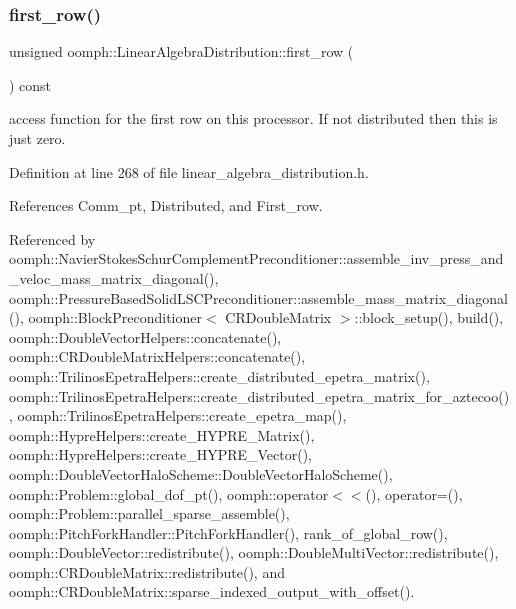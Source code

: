 \subsubsection{\texorpdfstring{first\+\_\+row()}{first\_row()}\hspace{0.1cm}{\footnotesize\ttfamily [1/2]}}
{\footnotesize\ttfamily unsigned oomph\+::\+Linear\+Algebra\+Distribution\+::first\+\_\+row (\begin{DoxyParamCaption}{ }\end{DoxyParamCaption}) const\hspace{0.3cm}{\ttfamily [inline]}}



access function for the first row on this processor. If not distributed then this is just zero. 



Definition at line 268 of file linear\+\_\+algebra\+\_\+distribution.\+h.



References Comm\+\_\+pt, Distributed, and First\+\_\+row.



Referenced by oomph\+::\+Navier\+Stokes\+Schur\+Complement\+Preconditioner\+::assemble\+\_\+inv\+\_\+press\+\_\+and\+\_\+veloc\+\_\+mass\+\_\+matrix\+\_\+diagonal(), oomph\+::\+Pressure\+Based\+Solid\+L\+S\+C\+Preconditioner\+::assemble\+\_\+mass\+\_\+matrix\+\_\+diagonal(), oomph\+::\+Block\+Preconditioner$<$ C\+R\+Double\+Matrix $>$\+::block\+\_\+setup(), build(), oomph\+::\+Double\+Vector\+Helpers\+::concatenate(), oomph\+::\+C\+R\+Double\+Matrix\+Helpers\+::concatenate(), oomph\+::\+Trilinos\+Epetra\+Helpers\+::create\+\_\+distributed\+\_\+epetra\+\_\+matrix(), oomph\+::\+Trilinos\+Epetra\+Helpers\+::create\+\_\+distributed\+\_\+epetra\+\_\+matrix\+\_\+for\+\_\+aztecoo(), oomph\+::\+Trilinos\+Epetra\+Helpers\+::create\+\_\+epetra\+\_\+map(), oomph\+::\+Hypre\+Helpers\+::create\+\_\+\+H\+Y\+P\+R\+E\+\_\+\+Matrix(), oomph\+::\+Hypre\+Helpers\+::create\+\_\+\+H\+Y\+P\+R\+E\+\_\+\+Vector(), oomph\+::\+Double\+Vector\+Halo\+Scheme\+::\+Double\+Vector\+Halo\+Scheme(), oomph\+::\+Problem\+::global\+\_\+dof\+\_\+pt(), oomph\+::operator$<$$<$(), operator=(), oomph\+::\+Problem\+::parallel\+\_\+sparse\+\_\+assemble(), oomph\+::\+Pitch\+Fork\+Handler\+::\+Pitch\+Fork\+Handler(), rank\+\_\+of\+\_\+global\+\_\+row(), oomph\+::\+Double\+Vector\+::redistribute(), oomph\+::\+Double\+Multi\+Vector\+::redistribute(), oomph\+::\+C\+R\+Double\+Matrix\+::redistribute(), and oomph\+::\+C\+R\+Double\+Matrix\+::sparse\+\_\+indexed\+\_\+output\+\_\+with\+\_\+offset().

